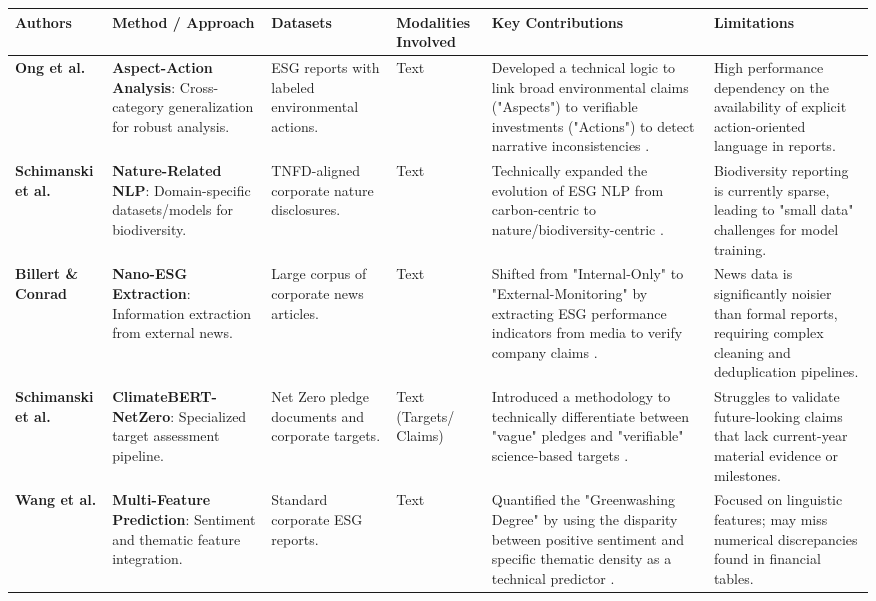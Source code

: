 \begin{landscape}
\begin{table}[p]
\centering
\small
\renewcommand{\arraystretch}{1.2}
\begin{tabularx}{\linewidth}{|p{1.8cm}|p{3.5cm}|p{3cm}|p{1.8cm}|X|X|}
\hline
Authors & Method / Approach & Datasets & Modalities Involved & Key Contributions & Limitations \\ \hline
\textbf{Ong et al.}  \parencite{keane_ong_369a0b63} & \textbf{Aspect-Action Analysis}: Cross-category generalization for robust analysis. & ESG reports with labeled environmental actions. & Text & Developed a technical logic to link broad environmental claims ("Aspects") to verifiable investments ("Actions") to detect narrative inconsistencies  \parencite{keane_ong_369a0b63}. & High performance dependency on the availability of explicit action-oriented language in reports. \\ \hline
\textbf{Schimanski et al.}  \parencite{tobias_schimanski_3549ff9f} & \textbf{Nature-Related NLP}: Domain-specific datasets/models for biodiversity. & TNFD-aligned corporate nature disclosures. & Text & Technically expanded the evolution of ESG NLP from carbon-centric to nature/biodiversity-centric  \parencite{tobias_schimanski_3549ff9f}. & Biodiversity reporting is currently sparse, leading to "small data" challenges for model training. \\ \hline
\textbf{Billert \& Conrad}  \parencite{fabian_billert_a5fbb687} & \textbf{Nano-ESG Extraction}: Information extraction from external news. & Large corpus of corporate news articles. & Text & Shifted from "Internal-Only" to "External-Monitoring" by extracting ESG performance indicators from media to verify company claims  \parencite{fabian_billert_a5fbb687}. & News data is significantly noisier than formal reports, requiring complex cleaning and deduplication pipelines. \\ \hline
\textbf{Schimanski et al.}  \parencite{tobias_schimanski_241ada20} & \textbf{ClimateBERT-NetZero}: Specialized target assessment pipeline. & Net Zero pledge documents and corporate targets. & Text (Targets/ Claims) & Introduced a methodology to technically differentiate between "vague" pledges and "verifiable" science-based targets  \parencite{tobias_schimanski_241ada20}. & Struggles to validate future-looking claims that lack current-year material evidence or milestones. \\ \hline
\textbf{Wang et al.}  \parencite{xiaojia_wang_02351a60} & \textbf{Multi-Feature Prediction}: Sentiment and thematic feature integration. & Standard corporate ESG reports. & Text & Quantified the "Greenwashing Degree" by using the disparity between positive sentiment and specific thematic density as a technical predictor  \parencite{xiaojia_wang_02351a60}. & Focused on linguistic features; may miss numerical discrepancies found in financial tables. \\ \hline

\end{tabularx}
\end{table}
\end{landscape}
